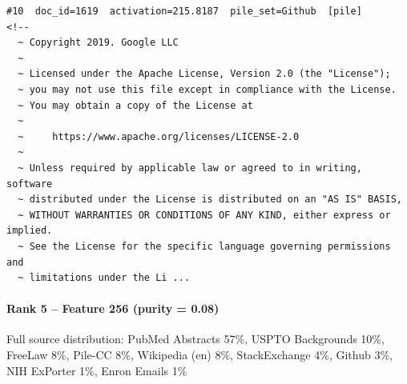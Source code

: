 \begin{verbatim}
#10  doc_id=1619  activation=215.8187  pile_set=Github  [pile]
<!--
  ~ Copyright 2019. Google LLC
  ~
  ~ Licensed under the Apache License, Version 2.0 (the "License");
  ~ you may not use this file except in compliance with the License.
  ~ You may obtain a copy of the License at
  ~
  ~     https://www.apache.org/licenses/LICENSE-2.0
  ~
  ~ Unless required by applicable law or agreed to in writing, software
  ~ distributed under the License is distributed on an "AS IS" BASIS,
  ~ WITHOUT WARRANTIES OR CONDITIONS OF ANY KIND, either express or implied.
  ~ See the License for the specific language governing permissions and
  ~ limitations under the Li ...

\end{verbatim}

\paragraph*{Rank 5 -- Feature 256 (purity = 0.08)}

Full source distribution: PubMed Abstracts 57\%, USPTO Backgrounds 10\%, FreeLaw 8\%, Pile-CC 8\%, Wikipedia (en) 8\%, StackExchange 4\%, Github 3\%, NIH ExPorter 1\%, Enron Emails 1\%

